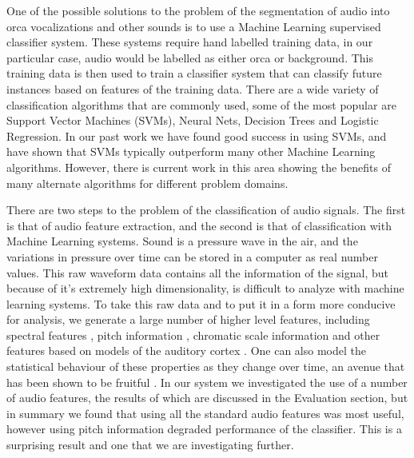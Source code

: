One of the possible solutions to the problem of the segmentation of
audio into orca vocalizations and other sounds is to use a Machine
Learning supervised classifier system.  These systems require hand
labelled training data, in our particular case, audio would be
labelled as either orca or background.  This training data is then
used to train a classifier system that can classify future instances
based on features of the training data.  There are a wide variety of
classification algorithms that are commonly used, some of the most
popular are Support Vector Machines (SVMs), Neural Nets, Decision
Trees and Logistic Regression.  In our past work we have found good
success in using SVMs, and have shown that SVMs typically outperform
many other Machine Learning algorithms.  However, there is current
work in this area showing the benefits of many alternate algorithms
for different problem domains.

There are two steps to the problem of the classification of audio
signals.  The first is that of audio feature extraction, and the
second is that of classification with Machine Learning systems.  Sound
is a pressure wave in the air, and the variations in pressure over
time can be stored in a computer as real number values.  This raw
waveform data contains all the information of the signal, but because
of it's extremely high dimensionality, is difficult to analyze with
machine learning systems.  To take this raw data and to put it in a
form more conducive for analysis, we generate a large number of higher
level features, including spectral features \cite{marsyas}, pitch
information \cite{cheveigne02}, chromatic scale information
\cite{marsyas} and other features based on models of the auditory
cortex \cite{lyon82}.  One can also model the statistical behaviour of
these properties as they change over time, an avenue that has been
shown to be fruitful \cite{marsyas}.  In our system we investigated
the use of a number of audio features, the results of which are
discussed in the Evaluation section, but in summary we found that
using all the standard audio features was most useful, however using
pitch information degraded performance of the classifier.  This is a
surprising result and one that we are investigating further.

